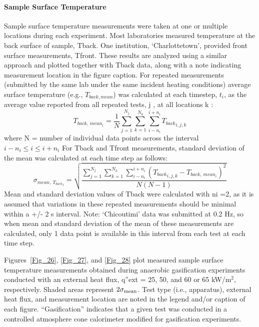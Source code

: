 \documentclass{book}
\begin{document}
\paragraph{Sample Surface Temperature}

Sample surface temperature measurements were taken at one or multiple locations during each experiment. Most laboratories measured temperature at the back surface of sample, Tback. One institution, ‘Charlottetown’, provided front surface measurements, Tfront. These results are analyzed using a similar approach and plotted together with Tback data, along with a note indicating measurement location in the figure caption. For repeated measurements (submitted by the same lab under the same incident heating conditions) average surface temperature (e.g., $T_{back,mean}$) was calculated at each timestep, $t_i$, as the average value reported from all repeated tests, j , at all locations k :
\begin{equation}
   T_{back,\ mean_i}=\frac{1}{N}\sum_{j=1}^{N_j}\sum_{k=1}^{N_k}\sum_{i-n_i}^{i+n_i}{T_{back}}_{i,j,k}
\end{equation}
where N = number of individual data points across the interval $i-n_i\le i\le i+n_i$
For Tback and Tfront measurements, standard deviation of the mean was calculated at each time step as follows:
\begin{equation}
   \sigma_{mean,\ {T_{back}}_i}=\sqrt{\frac{\sum_{j=1}^{N_j}\sum_{k=1}^{N_k}\sum_{i-n_i}^{i+n_i}\left({T_{back}}_{i,j,k}-T_{back,\ mean_i}\right)^2}{N\left(N-1\right)}}
\end{equation}
Mean and standard deviation values of Tback were calculated with ni =2, as it is assumed that variations in these repeated measurements should be minimal within a +/- 2 s interval. Note: ‘Chicoutimi’ data was submitted at 0.2 Hz, so when mean and standard deviation of the mean of these measurements are calculated, only 1 data point is available in this interval from each test at each time step.

Figures~\ref{Fig_26}, \ref{Fig_27}, and \ref{Fig_28} plot measured sample surface temperature measurements obtained during anaerobic gasification experiments conducted with an external heat flux, q”ext =  25, 50, and 60 or 65 kW/m$^2$, respectively. Shaded areas represent $2\sigma_{\rm mean}$. Test type (i.e., apparatus), external heat flux, and measurement location are noted in the legend and/or caption of each figure. ``Gasification'' indicates that a given test was conducted in a controlled atmosphere cone calorimeter modified for gasification experiments.
\end{document}
